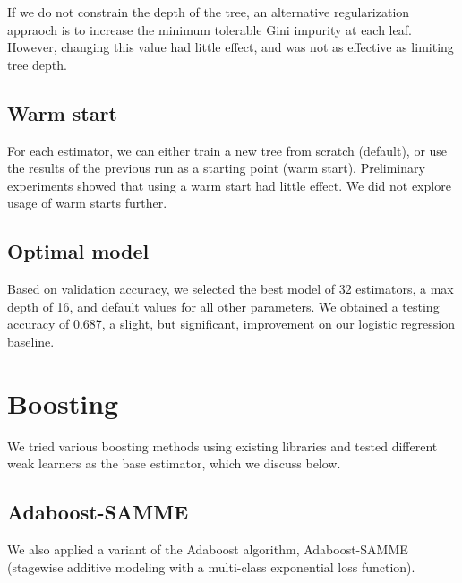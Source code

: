 \documentclass{article}
\begin{document}
\begin{multicols}{2}
If we do not constrain the depth of the tree,
an alternative regularization appraoch
is to increase the minimum tolerable Gini impurity at each leaf.
However,
changing this value had little effect,
and was not as effective as limiting tree depth.

\subsection{Warm start}

For each estimator,
we can either train a new tree from scratch (default),
or use the results of the previous run
as a starting point (warm start).
Preliminary experiments showed that using a warm start
had little effect.
We did not explore usage of warm starts further.

\subsection{Optimal model}
\label{subsec:rf-opt}

Based on validation accuracy,
we selected the best model
of 32 estimators, a max depth of 16,
and default values for all other parameters.
We obtained a testing accuracy of 0.687,
a slight, but significant, improvement
on our logistic regression baseline.

\section{Boosting}

We tried various boosting methods using existing libraries
and tested different weak learners as the base estimator,
which we discuss below.

\subsection{Adaboost-SAMME}

We also applied a variant of the Adaboost algorithm,
Adaboost-SAMME (stagewise additive modeling
with a multi-class exponential loss function).


\end{multicols}
\end{document}
